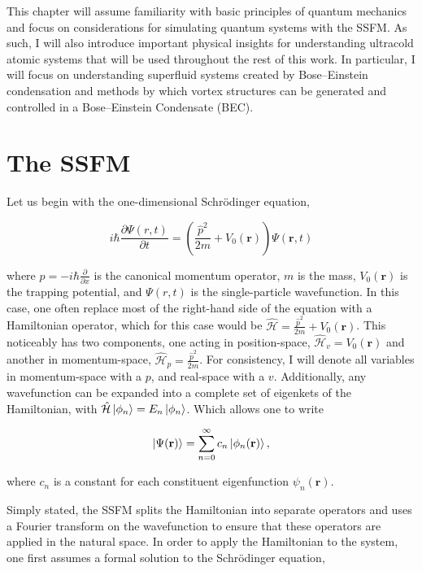 This chapter will assume familiarity with basic principles of quantum mechanics and focus on considerations for simulating quantum systems with the SSFM.
As such, I will also introduce important physical insights for understanding ultracold atomic systems that will be used throughout the rest of this work.
In particular, I will focus on understanding superfluid systems created by Bose--Einstein condensation and methods by which vortex structures can be generated and controlled in a Bose--Einstein Condensate (BEC).


\section{The SSFM}
Let us begin with the one-dimensional Schr\"odinger equation,

\begin{equation}
i\hbar \frac{\partial \Psi(r, t)}{\partial t} = \left(\frac{\hat p^2}{2m} + V_0(\mathbf{r}) \right)\Psi(\mathbf{r},t)
\label{eqn:schrody}
\end{equation}

\noindent where $\hat p = -i\hbar\frac{\partial}{\partial x}$ is the canonical momentum operator, $m$ is the mass, $V_0(\mathbf{r})$ is the trapping potential, and $\Psi(r,t)$ is the single-particle wavefunction.
In this case, one often replace most of the right-hand side of the equation with a Hamiltonian operator, which for this case would be $\mathcal{\hat H} = \frac{\hat p^2}{2m} + V_0(\mathbf{r})$.
This noticeably has two components, one acting in position-space, $\mathcal{\hat H}_v = V_0(\mathbf{r})$ and another in momentum-space, $\mathcal{\hat H}_p = \frac{\hat p^2}{2m}$.
For consistency, I will denote all variables in momentum-space with a $p$, and real-space with a $v$.
Additionally, any wavefunction can be expanded into a complete set of eigenkets of the Hamiltonian, with $\mathcal{\hat H}\ket{\phi_n} = E_n\ket{\phi_n}$.
Which allows one to write

\begin{equation}
\ket{\Psi(\mathbf{r})} = \sum_{n=0}^\infty c_n \ket{\phi_n(\mathbf{r})},
\end{equation}

\noindent where $c_n$ is a constant for each constituent eigenfunction $\psi_n(\mathbf{r})$.

Simply stated, the SSFM splits the Hamiltonian into separate operators and uses a Fourier transform on the wavefunction to ensure that these operators are applied in the natural space.
In order to apply the Hamiltonian to the system, one first assumes a formal solution to the Schr\"odinger equation,

